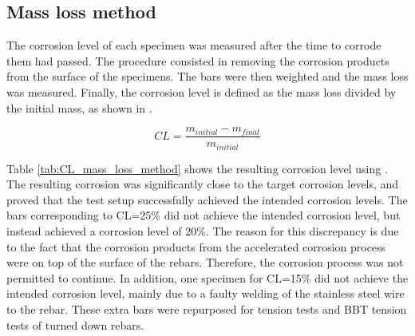 \subsection{Mass loss method}

The corrosion level of each specimen was measured after the time to corrode them had passed. The procedure consisted in removing the corrosion products from the surface of the specimens. The bars were then weighted and the mass loss was measured. Finally, the corrosion level is defined as the mass loss divided by the initial mass, as shown in .

\begin{equation}
    CL=\frac{m_{initial}-m_{final}}{m_{initial}}
    \label{eq:mass_loss_CL}
\end{equation}

Table \ref{tab:CL_mass_loss_method} shows the resulting corrosion level using . The resulting corrosion was significantly close to the target corrosion levels, and proved that the test setup successfully achieved the intended corrosion levels. The bars corresponding to CL=25\% did not achieve the intended corrosion level, but instead achieved a corrosion level of 20\%. The reason for this discrepancy is due to the fact that the corrosion products from the accelerated corrosion process were on top of the surface of the rebars. Therefore, the corrosion process was not permitted to continue. In addition, one specimen for CL=15\% did not achieve the intended corrosion level, mainly due to a faulty welding of the stainless steel wire to the rebar. These extra bars were repurposed for tension tests and BBT tension tests of turned down rebars.

